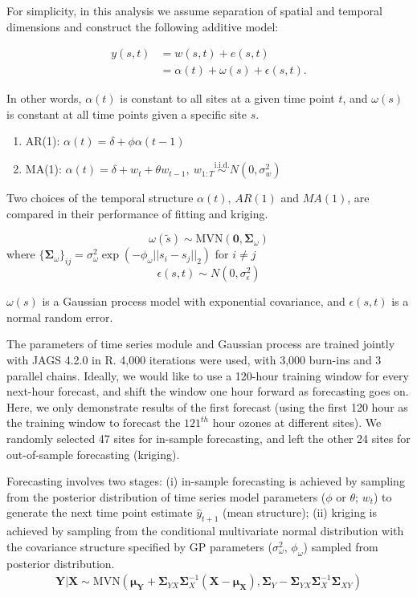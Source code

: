 \documentclass[12pt]{article}
\begin{document}
For simplicity, in this analysis we assume separation of spatial and temporal dimensions and construct the following additive model: 

\begin{align}
y(s, t) &= w(s, t) + e(s, t) \\
&= \alpha(t) + \omega(s) + \epsilon(s, t).
\end{align}

In other words, $\alpha(t)$ is constant to all sites at a given time point $t$, and $\omega(s)$ is constant at all time points given a specific site $s$. 

\begin{enumerate}
\item AR(1): $\alpha(t) = \delta + \phi \alpha(t - 1)$ 
\item MA(1): $\alpha(t) = \delta + w_t + \theta w_{t - 1},\ w_{1:T} \overset{\text{i.i.d.}}{\sim} N(0, \sigma_w^2)$
\end{enumerate}

Two choices of the temporal structure $\alpha(t)$, $AR(1)$ and $MA(1)$, are compared in their performance of fitting and kriging. 

\begin{equation}
\omega(\tilde{s}) \sim \mbox{MVN}(\mathbf{0}, \bm{\Sigma}_{\omega})
\end{equation}
where $\{\bm{\Sigma}_{\omega}\}_{ij} = \sigma_\omega^2 \exp(-\phi_{\omega}||s_i - s_j||_2)$ for $i \neq j$ \\
\begin{equation}
\epsilon(s, t) \sim N(0, \sigma_\epsilon^2)
\end{equation}

$\omega(s)$ is a Gaussian process model with exponential covariance, and $\epsilon(s, t)$ is a normal random error. 

The parameters of time series module and Gaussian process are trained jointly with JAGS 4.2.0 in R. 4,000 iterations were used, with 3,000 burn-ins and 3 parallel chains. Ideally, we would like to use a 120-hour training window for every next-hour forecast, and shift the window one hour forward as forecasting goes on. Here, we only demonstrate results of the first forecast (using the first 120 hour as the training window to forecast the $121^{th}$ hour ozones at different sites). We randomly selected 47 sites for in-sample forecasting, and left the other 24 sites for out-of-sample forecasting (kriging). 

Forecasting involves two stages: (i) in-sample forecasting is achieved by sampling from the posterior distribution of time series model parameters ($\phi$ or $\theta$; $w_t$) to generate the next time point estimate $\hat{y}_{t + 1}$ (mean structure); (ii) kriging is achieved by sampling from the conditional multivariate normal distribution with the covariance structure specified by GP parameters ($\sigma_{\omega}^2$, $\phi_{\omega}$) sampled from posterior distribution.
\begin{align}
\mathbf{Y}|\mathbf{X} \sim \mbox{MVN}(\bm{\mu}_{\mathbf{Y}} + \bm{\Sigma}_{YX}\bm{\Sigma}_{X}^{-1}(\mathbf{X} - \bm{\mu}_{\mathbf{X}}), \bm{\Sigma}_{Y} - \bm{\Sigma}_{YX}\bm{\Sigma}_{X}^{-1}\bm{\Sigma}_{XY})
\end{align}
\end{document}
